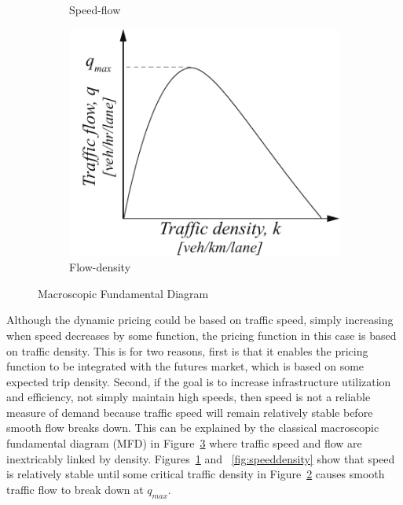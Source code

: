 \documentclass[10pt, letter, twocolumn]{article} %
\begin{document}
\begin{figure}[ht!]
\begin{subfigure}[h]{0.25\linewidth}
		\caption{Speed-flow}
		\label{fig:speedflow}
	\end{subfigure}
	\hfill
	\begin{subfigure}[h]{0.25\linewidth}
		\centering
		\includegraphics[width=\textwidth]{figures/flowdensity}
		\caption{Flow-density}
		\label{fig:flowdensity}
	\end{subfigure}
	\hfill
	\caption{Macroscopic Fundamental Diagram}
	\label{fig:MFD}
\end{figure}

Although the dynamic pricing could be based on traffic speed, simply increasing when speed decreases by some function, the pricing function in this case is based on traffic density. This is for two reasons, first is that it enables the pricing function to be integrated with the futures market, which is based on some expected trip density. Second, if the goal is to increase infrastructure utilization and efficiency, not simply maintain high speeds, then speed is not a reliable measure of demand because traffic speed will remain relatively stable before smooth flow breaks down. This can be explained by the classical macroscopic fundamental diagram (MFD) in Figure~\ref{fig:MFD} where traffic speed and flow are inextricably linked by density. Figures~\ref{fig:speedflow} and ~\ref{fig:speeddensity} show that speed is relatively stable until some critical traffic density in Figure~\ref{fig:flowdensity} causes smooth traffic flow to break down at $q_{max}$.
\end{document}
